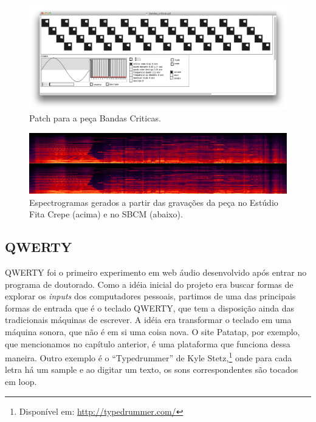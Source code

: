 \begin{figure}
    \caption{\label{bandaspatch}Patch para a peça Bandas Criticas. }
    \begin{center}
    \includegraphics[width=1\linewidth]{pictures/cap3/bandascriticaspd}
    \end{center}
\end{figure}

\begin{figure}
    \caption{\label{bandasciticasspec}Espectrogramas gerados a partir das gravações da peça no Estúdio Fita Crepe (acima) e no SBCM (abaixo). }
    \begin{center}
    \includegraphics[width=1\linewidth]{pictures/cap3/bandascriticasspectro2}
    \end{center}
\end{figure}



\subsection{QWERTY}
\label{sec:QWERTY}
QWERTY foi o primeiro experimento em web áudio desenvolvido após entrar no programa de doutorado. Como a idéia inicial do projeto era buscar formas de explorar os \emph{inputs} dos computadores pessoais, partimos de uma das  principais formas de entrada que é o teclado QWERTY, que tem a disposição ainda das tradicionais máquinas de escrever. A idéia era transformar o teclado em uma máquina sonora, que não é em si uma coisa nova. O site Patatap, por exemplo, que mencionamos no capítulo anterior, é uma plataforma que funciona dessa maneira. Outro exemplo é o ``Typedrummer'' de Kyle Stetz,\footnote{Disponível em: \url{http://typedrummer.com/}} onde para cada letra há um sample e ao digitar um texto, os sons correspondentes são tocados em loop.


